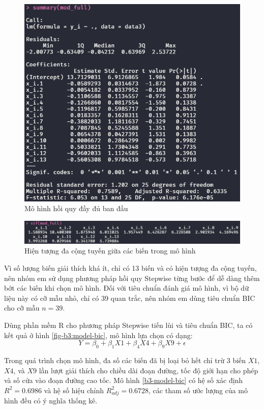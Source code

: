 \begin{figure}[H]
	\centering
	\includegraphics[width=0.65\linewidth]{images/B3/model-full}
	\caption{Mô hình hồi quy đầy đủ ban đầu}
	\label{fig-b3:model-full}
\end{figure}

\begin{figure}[H]
	\centering
	\includegraphics[width=0.8\linewidth]{images/B3/model-full-vif}
	\caption{Hiện tượng đa cộng tuyến giữa các biến trong mô hình}
	\label{fig-b3:model-full-vif}
\end{figure}

Vì số lượng biến giải thích khá ít, chỉ có 13 biến và có hiện tượng đa cộng tuyến, nên nhóm em sử dụng phương pháp hồi quy Stepwise từng bước để dễ dàng thêm bớt các biến khi chọn mô hình. Đối với tiêu chuẩn đánh giá mô hình, vì bộ dữ liệu này có cỡ mẫu nhỏ, chỉ có 39 quan trắc, nên nhóm em dùng tiêu chuẩn BIC cho cỡ mẫu $n=39$.

Dùng phần mềm R cho phương pháp Stepwise tiến lùi và tiêu chuẩn BIC, ta có kết quả ở hình \ref{fig-b3:model-bic}, mô hình lựa chọn có dạng:
\begin{equation}\label{b3-model-bic}
	Y = \beta_0 + \beta_1X1 + \beta_4X4 + \beta_9X9 + \epsilon
\end{equation}

Trong quá trình chọn mô hình, đa số các biến đã bị loại bỏ hết chỉ trừ 3 biến $X1$, $X4$, và $X9$ lần lượt giải thích cho chiều dài đoạn đường, tốc độ giới hạn cho phép và số cửa vào đoạn đường cao tốc. Mô hình \ref{b3-model-bic} có hệ số xác định $R^2 = 0.6986$ và hệ số hiệu chỉnh $R^2_{adj} = 0.6728$, các tham số ước lượng của mô hình đều có ý nghĩa thống kê. 

